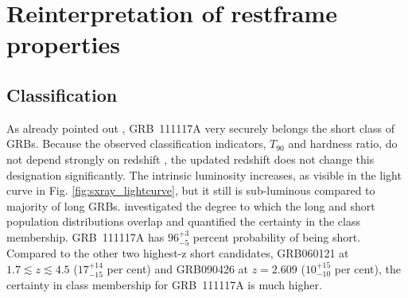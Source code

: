 \documentclass{aa}    %
\begin{document}
\section{Reinterpretation of restframe properties}


\subsection{Classification}

As already pointed out \citep{Margutti2012, Sakamoto2013}, GRB~111117A very securely belongs the short class of GRBs. Because the observed classification indicators, $T_{90}$ and hardness ratio, do not depend strongly on redshift \citep{Littlejohns2013a}, the updated redshift does not change this designation significantly. The intrinsic luminosity increases, as visible in the light curve in Fig. \ref{fig:sxray_lightcurve}, but it still is sub-luminous compared to majority of long GRBs. 
\citet{Bromberg2013} investigated the degree to which the long and short population distributions overlap and quantified the certainty in the class membership. GRB~111117A has $96_{-5}^{+3}$ percent probability of being short. Compared to the other two highest-z short candidates, GRB060121 \citep{DeUgartePostigo2006, Levan2006} at $1.7 \lesssim z \lesssim 4.5$ ($17_{-15}^{+14}$ per cent) and GRB090426 \citep{Antonelli2009, Levesque2010, Thone2011} at $z = 2.609$ ($10_{-10}^{+15}$ per cent), the certainty in class membership for GRB~111117A is much higher.
\end{document}
